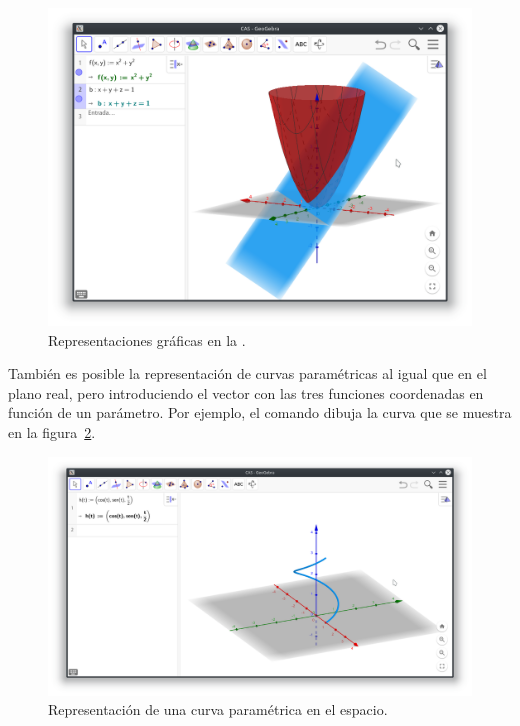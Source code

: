 \begin{figure}[h!]
\begin{center}
\includegraphics[width=\textwidth]{img/introduccion/3D-graphic-view}
\caption{Representaciones gráficas en la .} \label{g:vista-grafica-3D}
\end{center}
\end{figure}

También es posible la representación de curvas paramétricas al igual que en el plano real, pero introduciendo el vector con las tres funciones coordenadas en función de un parámetro.
Por ejemplo, el comando  dibuja la curva que se muestra en la figura~\ref{g:curva-parametrica-3D}.

\begin{figure}[h!]
\begin{center}
\includegraphics[width=\textwidth]{img/introduccion/3D-parametric-curve}
\caption{Representación de una curva paramétrica en el espacio.} \label{g:curva-parametrica-3D}
\end{center}
\end{figure}

